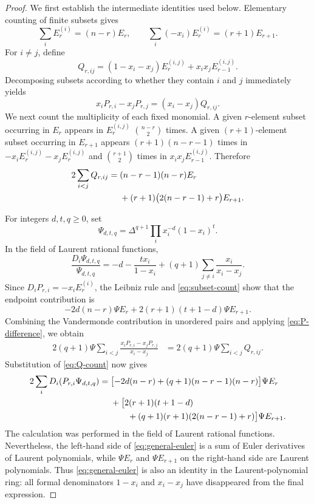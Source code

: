 \documentclass[11pt,a4paper]{article}
\theoremstyle{definition}
\begin{document}
\begin{proof}
We first establish the intermediate identities used below.  Elementary
counting of finite subsets gives
\begin{equation}\label{eq:subset-count}
\sum_iE_r^{(i)}=(n-r)E_r,\qquad
\sum_i(-x_i)E_r^{(i)}=(r+1)E_{r+1}.
\end{equation}
For $i\ne j$, define
\[
Q_{r,ij}=(1-x_i-x_j)E_r^{(i,j)}
+x_ix_jE_{r-1}^{(i,j)}.
\]
Decomposing subsets according to whether they contain $i$ and $j$
immediately yields
\begin{equation}\label{eq:P-difference}
x_iP_{r,i}-x_jP_{r,j}=(x_i-x_j)Q_{r,ij}.
\end{equation}
We next count the multiplicity of each fixed monomial.  A given
$r$-element subset occurring in $E_r$ appears in $E_r^{(i,j)}$
$\binom{n-r}{2}$ times.  A given $(r+1)$-element subset occurring in
$E_{r+1}$ appears $(r+1)(n-r-1)$ times in
$-x_iE_r^{(i,j)}-x_jE_r^{(i,j)}$ and $\binom{r+1}{2}$ times in
$x_ix_jE_{r-1}^{(i,j)}$.  Therefore
\begin{align}
2\sum_{i<j}Q_{r,ij}
={}&(n-r-1)(n-r)E_r\notag\\
&+(r+1)\bigl(2(n-r-1)+r\bigr)E_{r+1}.
\label{eq:Q-count}
\end{align}

For integers $d,t,q\ge0$, set
\[
\Psi_{d,t,q}=\Delta^{q+1}\prod_i x_i^{-d}(1-x_i)^t.
\]
In the field of Laurent rational functions,
\[
\frac{D_i\Psi_{d,t,q}}{\Psi_{d,t,q}}
=-d-\frac{t x_i}{1-x_i}
+(q+1)\sum_{j\ne i}\frac{x_i}{x_i-x_j}.
\]
Since $D_iP_{r,i}=-x_iE_r^{(i)}$, the Leibniz rule and
\eqref{eq:subset-count} show that the endpoint contribution is
\[
-2d(n-r)\Psi E_r
+2(r+1)(t+1-d)\Psi E_{r+1}.
\]
Combining the Vandermonde contribution in unordered pairs and applying
\eqref{eq:P-difference}, we obtain
\[
\begin{aligned}
2(q+1)\Psi\sum_{i<j}
\frac{x_iP_{r,i}-x_jP_{r,j}}{x_i-x_j}
&=2(q+1)\Psi\sum_{i<j}Q_{r,ij}.
\end{aligned}
\]
Substitution of \eqref{eq:Q-count} now gives
\begin{align}
2\sum_iD_i(P_{r,i}\Psi_{d,t,q})
={}&\bigl[-2d(n-r)+(q+1)(n-r-1)(n-r)\bigr]\Psi E_r
\notag\\
&+\bigl[2(r+1)(t+1-d)\notag\\
&\qquad +(q+1)(r+1)(2(n-r-1)+r)\bigr]\Psi E_{r+1}.
\label{eq:general-euler}
\end{align}
The calculation was performed in the field of Laurent rational
functions.  Nevertheless, the left-hand side of
\eqref{eq:general-euler} is a sum of Euler derivatives of Laurent
polynomials, while $\Psi E_r$ and $\Psi E_{r+1}$ on the right-hand
side are Laurent polynomials.  Thus \eqref{eq:general-euler} is also
an identity in the Laurent-polynomial ring: all formal denominators
$1-x_i$ and $x_i-x_j$ have disappeared from the final expression.


\end{proof}
\end{document}

